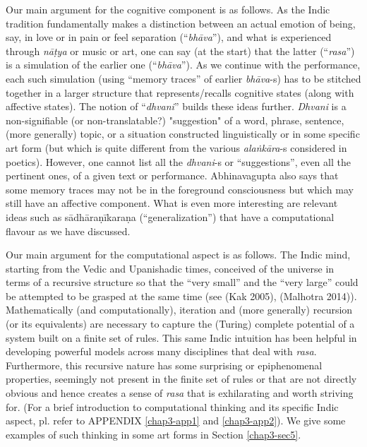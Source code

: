 \newpage

Our main argument for the cognitive component is as follows. As the Indic tradition fundamentally makes a distinction between an actual emotion of being, say, in love or in pain or feel separation (“\textsl{bhāva}”), and what is experienced through \textsl{nāṭya} or music or art, one can say (at the start) that the latter (“\textsl{rasa}”) is a simulation of the earlier one (“\textsl{bhāva}”). As we continue with the performance, each such simulation (using “memory traces” of earlier \textsl{bhāva}-s) has to be stitched together in a larger structure that represents/recalls cognitive states (along with affective states). The notion of “\textsl{dhvani}” builds these ideas further. \textsl{Dhvani} is a non-signifiable (or non-translatable?) "suggestion" of a word, phrase, sentence, (more generally) topic, or a situation constructed linguistically or in some specific art form (but which is quite different from the various \textsl{alaṅkāra}-s considered in poetics). However, one cannot list all the \textsl{dhvani}-s or “suggestions”, even all the pertinent ones, of a given text or performance. Abhinavagupta also says that some memory traces may not be in the foreground consciousness but which may still have an affective component. What is even more interesting are relevant ideas such as sādhāraṇīkaraṇa (“generalization”) that have a computational flavour as we have discussed.

Our main argument for the computational aspect is as follows. The Indic mind, starting from the Vedic and Upanishadic times, conceived of the universe in terms of a recursive structure so that the “very small” and the “very large” could be attempted to be grasped at the same time (see (Kak 2005), (Malhotra 2014)). Mathematically (and computationally), iteration and (more generally) recursion (or its equivalents) are necessary to capture the (Turing) complete potential of a system built on a finite set of rules. This same Indic intuition has been helpful in developing powerful models across many disciplines that deal with \textsl{rasa}. Furthermore, this recursive nature has some surprising or epiphenomenal properties, seemingly not present in the finite set of rules or that are not directly obvious and hence creates a sense of \textsl{rasa} that is exhilarating and worth striving for. (For a brief introduction to computational thinking and its specific Indic aspect, pl. refer to APPENDIX \ref{chap3-app1} and \ref{chap3-app2}). We give some examples of such thinking in some art forms in Section \ref{chap3-sec5}.


